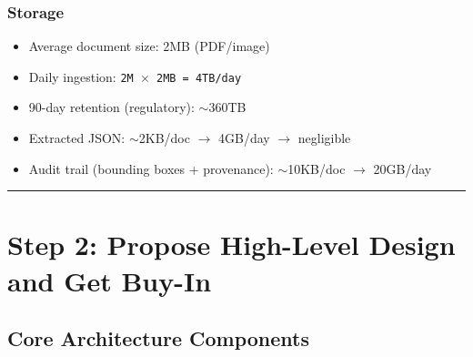 \subsubsection*{Storage}

\begin{itemize}
  \item Average document size: 2MB (PDF/image)
  \item Daily ingestion: \texttt{2M $\times$ 2MB = 4TB/day}
  \item 90-day retention (regulatory): $\sim$360TB
  \item Extracted JSON: $\sim$2KB/doc $\rightarrow$ 4GB/day $\rightarrow$ negligible
  \item Audit trail (bounding boxes + provenance): $\sim$10KB/doc $\rightarrow$ 20GB/day
\end{itemize}

\bigskip\hrule\bigskip

\section*{Step 2: Propose High-Level Design and Get Buy-In}

\subsection*{Core Architecture Components}

